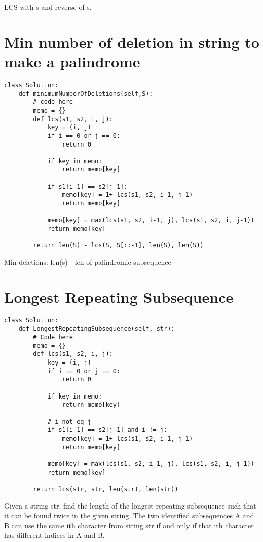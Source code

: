 \documentclass[24pt, a4]{article}
\begin{document}
LCS with s and reverse of s.

\newpage 
\section{Min number of deletion in string to make a palindrome}
\begin{lstlisting}
class Solution:
    def minimumNumberOfDeletions(self,S):
        # code here 
        memo = {}
        def lcs(s1, s2, i, j):
            key = (i, j)
            if i == 0 or j == 0:
                return 0
                
            if key in memo:
                return memo[key]
                
            if s1[i-1] == s2[j-1]:
                memo[key] = 1+ lcs(s1, s2, i-1, j-1)
                return memo[key]
                
            memo[key] = max(lcs(s1, s2, i-1, j), lcs(s1, s2, i, j-1))
            return memo[key]
    
        return len(S) - lcs(S, S[::-1], len(S), len(S))
\end{lstlisting}

Min deletions: len(s) - len of palindromic subsequence

\newpage
\section{Longest Repeating Subsequence}
\begin{lstlisting}
class Solution:
    def LongestRepeatingSubsequence(self, str):
        # Code here
        memo = {}
        def lcs(s1, s2, i, j):
            key = (i, j)
            if i == 0 or j == 0:
                return 0
                
            if key in memo:
                return memo[key]
            
            # i not eq j    
            if s1[i-1] == s2[j-1] and i != j:
                memo[key] = 1+ lcs(s1, s2, i-1, j-1)
                return memo[key]
                
            memo[key] = max(lcs(s1, s2, i-1, j), lcs(s1, s2, i, j-1))
            return memo[key]
        
        return lcs(str, str, len(str), len(str))
\end{lstlisting}
Given a string str, find the length of the longest repeating subsequence such that it can be found twice in the given string. The two identified subsequences A and B can use the same ith character from string str if and only if that ith character has different indices in A and B.
\end{document}
